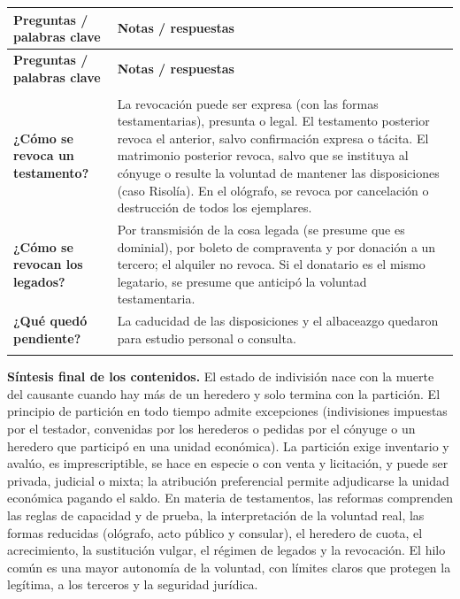 \documentclass[12pt,oneside]{book}
\newenvironment{cornell}{%
    \begin{longtable}{>{\raggedright\arraybackslash}p{0.27\textwidth}
                      >{\raggedright\arraybackslash}p{0.66\textwidth}}
    \toprule
    \textbf{Preguntas / palabras clave} & \textbf{Notas / respuestas} \\
    \midrule
    \endfirsthead
    \toprule
    \textbf{Preguntas / palabras clave} & \textbf{Notas / respuestas} \\
    \midrule
    \endhead
    \midrule[0.3pt]
    \multicolumn{2}{r}{\footnotesize\textit{Continúa en la página siguiente}} \\
    \endfoot
    \endlastfoot
}{%
    \end{longtable}
}
\newcommand{\cornellrow}[2]{%
    \textbf{#1} & #2 \\
    \midrule[0.3pt]
}
\newcommand{\cornellsummary}[1]{%
    \midrule
    \multicolumn{2}{p{\dimexpr0.93\textwidth+2\tabcolsep\relax}}{%
        \textbf{Resumen:} #1} \\
    \bottomrule
}
\begin{document}
\begin{cornell}
\cornellrow{¿Cómo se revoca un testamento?}{La revocación puede ser expresa (con las formas testamentarias), presunta o legal. El testamento posterior revoca el anterior, salvo confirmación expresa o tácita. El matrimonio posterior revoca, salvo que se instituya al cónyuge o resulte la voluntad de mantener las disposiciones (caso Risolía). En el ológrafo, se revoca por cancelación o destrucción de todos los ejemplares.}
\cornellrow{¿Cómo se revocan los legados?}{Por transmisión de la cosa legada (se presume que es dominial), por boleto de compraventa y por donación a un tercero; el alquiler no revoca. Si el donatario es el mismo legatario, se presume que anticipó la voluntad testamentaria.}
\cornellrow{¿Qué quedó pendiente?}{La caducidad de las disposiciones y el albaceazgo quedaron para estudio personal o consulta.}
\cornellsummary{La voluntad del testador persevera hasta la muerte si no la revoca. La revocación puede ser expresa, presunta o legal; el testamento ulterior revoca al anterior salvo confirmación, el matrimonio posterior revoca salvo voluntad de mantener las disposiciones, y los legados se revocan por transmisión, boleto o donación. La caducidad y el albaceazgo quedaron como temas de estudio pendiente.}
\end{cornell}

\vspace{1em}
\begin{important}
\textbf{Síntesis final de los contenidos.} El estado de indivisión nace con la muerte del causante cuando hay más de un heredero y solo termina con la partición. El principio de partición en todo tiempo admite excepciones (indivisiones impuestas por el testador, convenidas por los herederos o pedidas por el cónyuge o un heredero que participó en una unidad económica). La partición exige inventario y avalúo, es imprescriptible, se hace en especie o con venta y licitación, y puede ser privada, judicial o mixta; la atribución preferencial permite adjudicarse la unidad económica pagando el saldo. En materia de testamentos, las reformas comprenden las reglas de capacidad y de prueba, la interpretación de la voluntad real, las formas reducidas (ológrafo, acto público y consular), el heredero de cuota, el acrecimiento, la sustitución vulgar, el régimen de legados y la revocación. El hilo común es una mayor autonomía de la voluntad, con límites claros que protegen la legítima, a los terceros y la seguridad jurídica.
\end{important}
\end{document}
